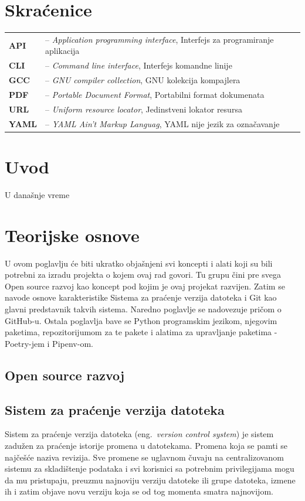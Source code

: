 \documentclass[12pt]{report}
\renewcommand{\chaptermark}[1]{\markboth{#1}{}}
\newcommand\frontmatter{
    \cleardoublepage{}
    \pagenumbering{Roman}
    \setlength{\parskip}{0pt}
}
\newcommand\mainmatter{
    \cleardoublepage{}
    \pagenumbering{arabic}
    \setlength{\parskip}{2mm}
    \titleformat{\chapter}{\normalfont\Large\bf\sffamily\raggedleft}{\thechapter.}{12pt}{}
}
\begin{document}
\frontmatter{}

\renewcommand{\MakeUppercase}[1]{#1}
\tableofcontents

\listoffigures

\chapter*{Skraćenice}
\chaptermark{Skraćenice}
\begin{tabular}{ l l }
    \textbf{API} & -- \textit{Application programming interface}, Interfejs za programiranje aplikacija \\
    \textbf{CLI} & -- \textit{Command line interface}, Interfejs komandne linije \\
    \textbf{GCC} & -- \textit{GNU compiler collection}, GNU kolekcija kompajlera \\
    \textbf{PDF} & -- \textit{Portable Document Format}, Portabilni format dokumenata \\
    \textbf{URL} & -- \textit{Uniform resource locator}, Jedinstveni lokator resursa \\
    \textbf{YAML} & -- \textit{YAML Ain't Markup Languag}, YAML nije jezik za označavanje \\
\end{tabular}

\mainmatter{}
\chapter{Uvod}
U današnje vreme

\chapter{Teorijske osnove}
U ovom poglavlju će biti ukratko objašnjeni svi koncepti i alati koji su bili potrebni za izradu projekta o kojem ovaj rad govori. Tu grupu čini pre svega Open source razvoj kao koncept pod kojim je ovaj projekat razvijen. Zatim se navode osnove karakteristike Sistema za praćenje verzija datoteka i Git kao glavni predstavnik takvih sistema. Naredno poglavlje se nadovezuje pričom o GitHub-u. Ostala poglavlja bave se Python programskim jezikom, njegovim paketima, repozitorijumom za te pakete i alatima za upravljanje paketima - Poetry-jem i Pipenv-om.

\section{Open source razvoj}
\section{Sistem za praćenje verzija datoteka}
Sistem za praćenje verzija datoteka (eng.\ \textit{version control system}) je sistem zadužen za praćenje istorije promena u datotekama. Promena koja se pamti se najčešće naziva revizija. Sve promene se uglavnom čuvaju na centralizovanom sistemu za skladištenje podataka i svi korisnici sa potrebnim privilegijama mogu da mu pristupaju, preuzmu najnoviju verziju datoteke ili grupe datoteka, izmene ih i zatim objave novu verziju koja se od tog momenta smatra najnovijom.
\end{document}
